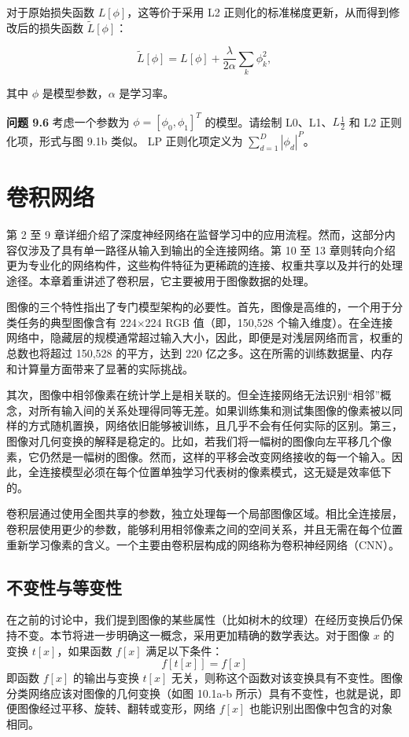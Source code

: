 \documentclass[lang=cn,newtx,10pt,scheme=chinese]{elegantbook}
\begin{document}
对于原始损失函数 \(L[\phi]\)，这等价于采用 L2 正则化的标准梯度更新，从而得到修改后的损失函数 \(\tilde{L}[\phi]\)：

\begin{equation}
\tilde{L}[\phi] = L[\phi] + \frac{\lambda}{2\alpha} \sum_{k} \phi_k^2, 
\end{equation}

其中 \(\phi\) 是模型参数，\(\alpha\) 是学习率。

\textbf{问题 9.6} 考虑一个参数为 \(\phi = [\phi_0, \phi_1]^T\) 的模型。请绘制 L0、L1、\(L\frac{1}{2}\) 和 L2 正则化项，形式与图 9.1b 类似。 LP 正则化项定义为 \(\sum_{d=1}^{D} |\phi_d|^P\)。


\chapter{卷积网络}

第 2 至 9 章详细介绍了深度神经网络在监督学习中的应用流程。然而，这部分内容仅涉及了具有单一路径从输入到输出的全连接网络。第 10 至 13 章则转向介绍更为专业化的网络构件，这些构件特征为更稀疏的连接、权重共享以及并行的处理途径。本章着重讲述了卷积层，它主要被用于图像数据的处理。

图像的三个特性指出了专门模型架构的必要性。首先，图像是高维的，一个用于分类任务的典型图像含有 224×224 RGB 值（即，150,528 个输入维度）。在全连接网络中，隐藏层的规模通常超过输入大小，因此，即便是对浅层网络而言，权重的总数也将超过 150,528 的平方，达到 220 亿之多。这在所需的训练数据量、内存和计算量方面带来了显著的实际挑战。

其次，图像中相邻像素在统计学上是相关联的。但全连接网络无法识别“相邻”概念，对所有输入间的关系处理得同等无差。如果训练集和测试集图像的像素被以同样的方式随机置换，网络依旧能够被训练，且几乎不会有任何实际的区别。第三，图像对几何变换的解释是稳定的。比如，若我们将一幅树的图像向左平移几个像素，它仍然是一幅树的图像。然而，这样的平移会改变网络接收的每一个输入。因此，全连接模型必须在每个位置单独学习代表树的像素模式，这无疑是效率低下的。

卷积层通过使用全图共享的参数，独立处理每一个局部图像区域。相比全连接层，卷积层使用更少的参数，能够利用相邻像素之间的空间关系，并且无需在每个位置重新学习像素的含义。一个主要由卷积层构成的网络称为卷积神经网络（CNN）。

\section{不变性与等变性}
在之前的讨论中，我们提到图像的某些属性（比如树木的纹理）在经历变换后仍保持不变。本节将进一步明确这一概念，采用更加精确的数学表达。对于图像 \(x\) 的变换 \(t[x]\)，如果函数 \(f[x]\) 满足以下条件：
\begin{equation}
f[t[x]] = f[x] 
\end{equation}
即函数 \(f[x]\) 的输出与变换 \(t[x]\) 无关，则称这个函数对该变换具有不变性。图像分类网络应该对图像的几何变换（如图 10.1a-b 所示）具有不变性，也就是说，即便图像经过平移、旋转、翻转或变形，网络 \(f[x]\) 也能识别出图像中包含的对象相同。
\end{document}
